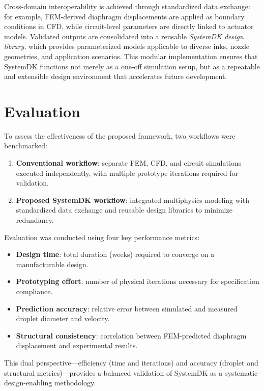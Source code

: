 \documentclass[conference]{IEEEtran}
\begin{document}
Cross-domain interoperability is achieved through standardized data exchange: for example, FEM-derived diaphragm displacements are applied as boundary conditions in CFD, while circuit-level parameters are directly linked to actuator models. 
Validated outputs are consolidated into a reusable \emph{SystemDK design library}, which provides parameterized models applicable to diverse inks, nozzle geometries, and application scenarios. 
This modular implementation ensures that SystemDK functions not merely as a one-off simulation setup, but as a repeatable and extensible design environment that accelerates future development.

\section{Evaluation}
To assess the effectiveness of the proposed framework, two workflows were benchmarked:  
\begin{enumerate}
  \item \textbf{Conventional workflow}: separate FEM, CFD, and circuit simulations executed independently, with multiple prototype iterations required for validation.  
  \item \textbf{Proposed SystemDK workflow}: integrated multiphysics modeling with standardized data exchange and reusable design libraries to minimize redundancy.  
\end{enumerate}

Evaluation was conducted using four key performance metrics:  
\begin{itemize}
  \item \textbf{Design time}: total duration (weeks) required to converge on a manufacturable design.  
  \item \textbf{Prototyping effort}: number of physical iterations necessary for specification compliance.  
  \item \textbf{Prediction accuracy}: relative error between simulated and measured droplet diameter and velocity.  
  \item \textbf{Structural consistency}: correlation between FEM-predicted diaphragm displacement and experimental results.  
\end{itemize}

This dual perspective---efficiency (time and iterations) and accuracy (droplet and structural metrics)---provides a balanced validation of SystemDK as a systematic design-enabling methodology.
\end{document}
